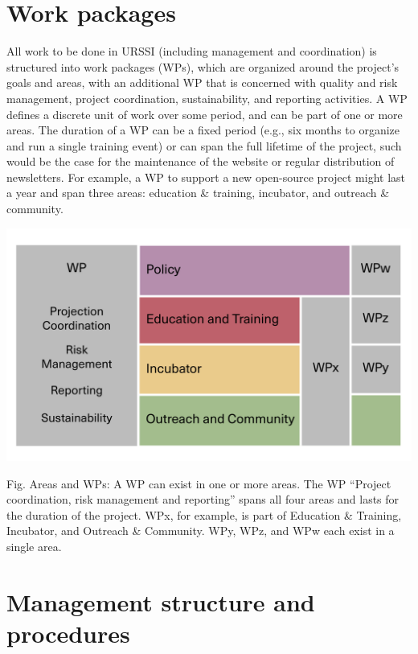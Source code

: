 \documentclass[
]{book}
\begin{document}
\hypertarget{work-packages}{%
\section{Work packages}\label{work-packages}}

All work to be done in URSSI (including management and coordination) is structured into
work packages (WPs), which are organized around the project's goals and areas, with an additional
WP that is concerned with quality and risk management, project coordination, sustainability, and
reporting activities. A WP defines a discrete unit of work over some period, and can be part of
one or more areas. The duration of a WP can be a fixed period (e.g., six months to organize and
run a single training event) or can span the full lifetime of the project, such would be the case
for the maintenance of the website or regular distribution of newsletters. For example, a WP to
support a new open-source project might last a year and span three areas: education \& training,
incubator, and outreach \& community.

\includegraphics{images/WPs-v3.jpg}

Fig. Areas and WPs: A WP can exist in one or more areas. The WP ``Project coordination, risk management
and reporting'' spans all four areas and lasts for the duration of the project. WPx, for example, is
part of Education \& Training, Incubator, and Outreach \& Community. WPy, WPz, and WPw each exist in
a single area.

\hypertarget{management-structure-and-procedures}{%
\section{Management structure and procedures}\label{management-structure-and-procedures}}
\end{document}
